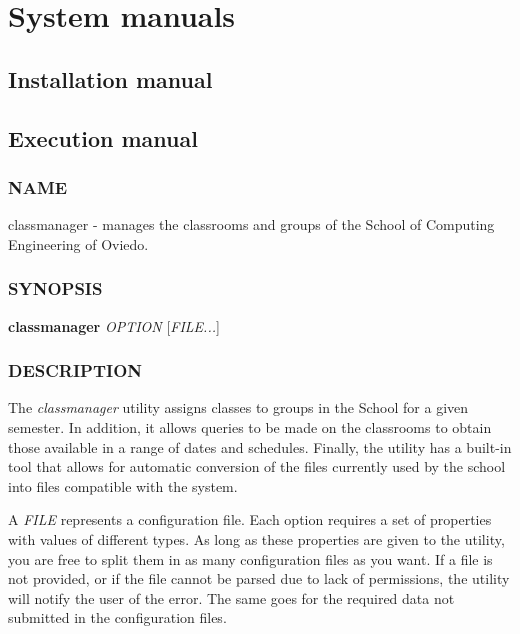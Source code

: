 \renewcommand{\documentname}{System manuals}

\chapter{System manuals}


\section{Installation manual}



\section{Execution manual}


\subsection*{NAME}

\begin{description}
    \item classmanager - manages the classrooms and groups of the School of Computing Engineering of Oviedo.
\end{description}


\subsection*{SYNOPSIS}

\begin{description}
    \item \textbf{classmanager} \textit{OPTION} [\textit{FILE...}]
\end{description}


\subsection*{DESCRIPTION}

The \textit{classmanager} utility assigns classes to groups in the School for a given semester. In addition, it allows queries to be made on the classrooms to obtain those available in a range of dates and schedules. Finally, the utility has a built-in tool that allows for automatic conversion of the files currently used by the school into files compatible with the system. 

A \textit{FILE} represents a configuration file. Each option requires a set of properties with values of different types. As long as these properties are given to the utility, you are free to split them in as many configuration files as you want. If a file is not provided, or if the file cannot be parsed due to lack of permissions, the utility will notify the user of the error. The same goes for the required data not submitted in the configuration files. 


